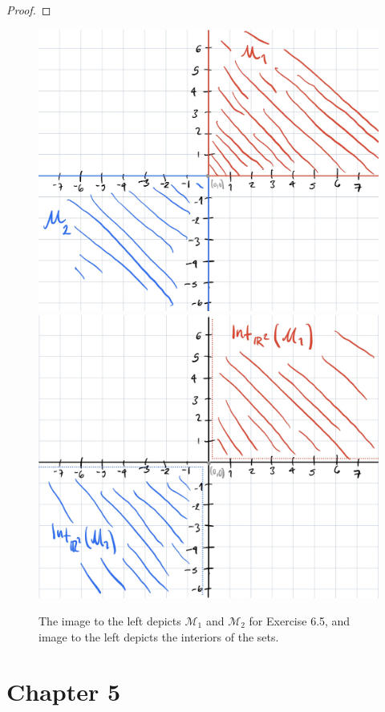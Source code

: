 \documentclass[oneside]{amsart}
\theoremstyle{definition}
\begin{document}
\begin{tcolorbox}[colback=black!5!white,colframe=black!75!black,title= Chapter 4; $\S 6.2$: Exercise $6.5.$]
\begin{proof}
\end{proof}
\end{tcolorbox}
\begin{figure}[h!] 
\includegraphics[scale = .12]{IMG_0710.jpg} 
\includegraphics[scale = .12]{IMG_0711.jpg}
\caption{The image to the left depicts $\mathcal M_1$ and $\mathcal M_2$ for Exercise 6.5, and image to the left depicts the interiors of the sets.}
\end{figure}
 \section{Chapter 5}
 
\end{document}
